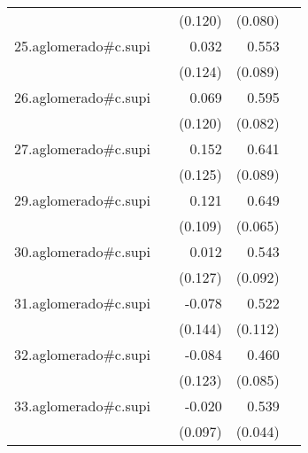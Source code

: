{\begin{longtable}{l*{4}{D{.}{.}{-1}}}
            &                     &     (0.120)         &     (0.080)         &                     \\
\addlinespace
25.aglomerado#c.supi&                     &       0.032         &       0.553\sym{***}&                     \\
            &                     &     (0.124)         &     (0.089)         &                     \\
\addlinespace
26.aglomerado#c.supi&                     &       0.069         &       0.595\sym{***}&                     \\
            &                     &     (0.120)         &     (0.082)         &                     \\
\addlinespace
27.aglomerado#c.supi&                     &       0.152         &       0.641\sym{***}&                     \\
            &                     &     (0.125)         &     (0.089)         &                     \\
\addlinespace
29.aglomerado#c.supi&                     &       0.121         &       0.649\sym{***}&                     \\
            &                     &     (0.109)         &     (0.065)         &                     \\
\addlinespace
30.aglomerado#c.supi&                     &       0.012         &       0.543\sym{***}&                     \\
            &                     &     (0.127)         &     (0.092)         &                     \\
\addlinespace
31.aglomerado#c.supi&                     &      -0.078         &       0.522\sym{***}&                     \\
            &                     &     (0.144)         &     (0.112)         &                     \\
\addlinespace
32.aglomerado#c.supi&                     &      -0.084         &       0.460\sym{***}&                     \\
            &                     &     (0.123)         &     (0.085)         &                     \\
\addlinespace
33.aglomerado#c.supi&                     &      -0.020         &       0.539\sym{***}&                     \\
            &                     &     (0.097)         &     (0.044)         &                     \\

\end{longtable}}
